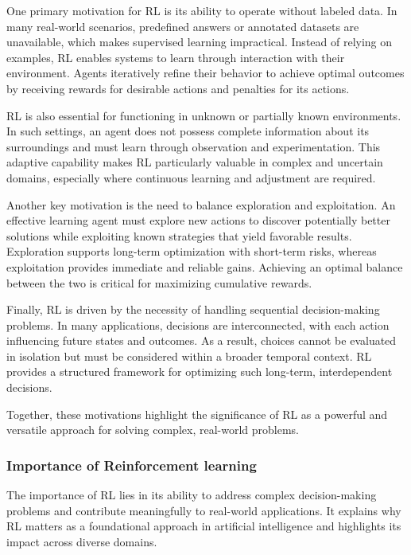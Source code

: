 \documentclass[
  authoryear,
  preprint]{elsarticle}
\begin{document}
One primary motivation for RL is its ability to operate without labeled
data. In many real-world scenarios, predefined answers or annotated
datasets are unavailable, which makes supervised learning impractical.
Instead of relying on examples, RL enables systems to learn through
interaction with their environment. Agents iteratively refine their
behavior to achieve optimal outcomes by receiving rewards for desirable
actions and penalties for its actions.

RL is also essential for functioning in unknown or partially known
environments. In such settings, an agent does not possess complete
information about its surroundings and must learn through observation
and experimentation. This adaptive capability makes RL particularly
valuable in complex and uncertain domains, especially where continuous
learning and adjustment are required.

Another key motivation is the need to balance exploration and
exploitation. An effective learning agent must explore new actions to
discover potentially better solutions while exploiting known strategies
that yield favorable results. Exploration supports long-term
optimization with short-term risks, whereas exploitation provides
immediate and reliable gains. Achieving an optimal balance between the
two is critical for maximizing cumulative rewards.

Finally, RL is driven by the necessity of handling sequential
decision-making problems. In many applications, decisions are
interconnected, with each action influencing future states and outcomes.
As a result, choices cannot be evaluated in isolation but must be
considered within a broader temporal context. RL provides a structured
framework for optimizing such long-term, interdependent decisions.

Together, these motivations highlight the significance of RL as a
powerful and versatile approach for solving complex, real-world
problems.

\subsubsection{Importance of Reinforcement
learning}\label{importance-of-reinforcement-learning}

The importance of RL lies in its ability to address complex
decision-making problems and contribute meaningfully to real-world
applications. It explains why RL matters as a foundational approach in
artificial intelligence and highlights its impact across diverse
domains.
\end{document}
